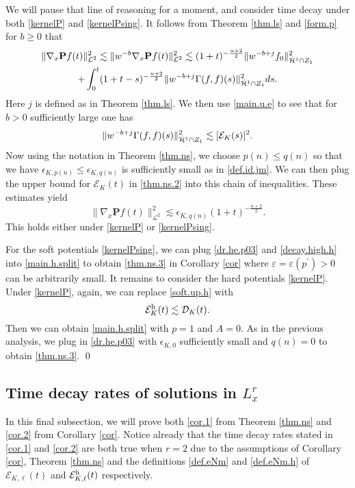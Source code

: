 \documentclass{amsart}
\numberwithin{equation}{section}
\begin{document}
We will pause that line of reasoning for a moment, and consider time decay under both \eqref{kernelP} and \eqref{kernelPsing}.
It follows from Theorem \ref{thm.ls} and \eqref{form.p} for ${b} \ge 0$ that
\begin{multline}
\notag
\|{\nabla}_x{\mathbf{P}} {f}(t)\|_{{\mathcal{L}}^2}^2
\lesssim 
\|w^{-{b}}{\nabla}_x{\mathbf{P}} {f}(t)\|_{{\mathcal{L}}^2}^2
\lesssim 
(1+t)^{-\frac{{n}+2}{2}} \|w^{-{b}+{j}}{f}_0\|_{{\dot{\mathcal{H}}}^{1}\cap Z_1}^2\\
 + \int_0^t (1+t-s)^{-\frac{{n}+2}{2}} \|w^{-{b}+{j}} \Gamma({f},{f})(s)\|^2_{{\dot{\mathcal{H}}}^{1}\cap Z_1}ds.
\end{multline}
Here ${j}$ is defined as in Theorem \ref{thm.ls}.  
We then use \eqref{main.u.e} to see that for $b>0$ sufficiently large one has  
\begin{equation}
 \|w^{-{b}+{j}} \Gamma({f},{f})(s)\|^2_{{\dot{\mathcal{H}}}^{1}\cap Z_1}
 \lesssim
[{\mathcal{E}}_{K}(s)]^2.
\notag
\end{equation}
Now using the notation in Theorem \ref{thm.ns}, we choose ${p({n})} \le {q({n})}$ so that we have ${\epsilon}_{{K},{p({n})}}\le {\epsilon}_{{K},{q({n})}}$ is sufficiently small as in \eqref{def.id.jm}.
We can then plug the upper bound for ${\mathcal{E}}_{K}(t)$ in  \eqref{thm.ns.2} into this chain of inequalities.  These estimates yield
\begin{equation}  \label{dr.he.p03}
\|{\nabla}_x{\mathbf{P}} {f}(t)\|_{{\mathcal{L}}^2}^2
\lesssim
{\epsilon}_{{K},{q({n})}} (1+t)^{-\frac{{n}+2}{2}}.
\end{equation}
This holds either under \eqref{kernelP} or \eqref{kernelPsing}.  

For the soft potentials \eqref{kernelPsing}, we can plug \eqref{dr.he.p03} and \eqref{decay.high.h} into \eqref{main.h.split} to obtain \eqref{thm.ns.3} in Corollary \ref{cor} where $\varepsilon = \varepsilon(p^\prime)>0$ can be arbitrarily small.  It remains to consider the hard potentials \eqref{kernelP}.  Under \eqref{kernelP}, again, we can replace \eqref{soft.up.h} with 
$$
{\mathcal{E}}_{K}^{{\rm h}}(t) \lesssim   {\mathcal{D}}_{K}(t).
$$
Then we can obtain \eqref{main.h.split} with $p=1$ and ${A} =0$.
As in the previous analysis, we plug in \eqref{dr.he.p03}  with ${\epsilon}_{{K},0}$ sufficiently small and ${q({n})} =0$
to obtain \eqref{thm.ns.3}.
\qed

\subsection{Time decay rates of solutions in $L^r_x$}\label{sec.decayNL.3} In this final subsection, we will prove both 
\eqref{cor.1} from Theorem \ref{thm.ns} and 
\eqref{cor.2} from Corollary \ref{cor}. Notice already that the time decay rates stated in \eqref{cor.1} and \eqref{cor.2} are both true when $r=2$ due to the  assumptions of Corollary \ref{cor}, Theorem \ref{thm.ns} and the definitions \eqref{def.eNm} and \eqref{def.eNm.h} of ${\mathcal{E}}_{{K},{\ell}}(t)$ and ${\mathcal{E}}_{{K},{\ell}}^{\rm h}(t)$ respectively.  
\end{document}
